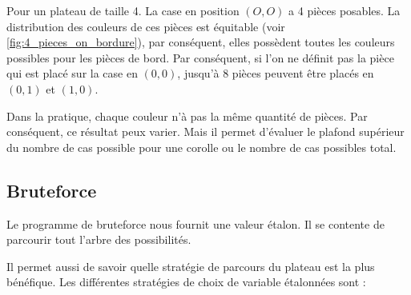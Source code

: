	\begin{exmp}
		Pour un plateau de taille 4. La case en position $(O,O)$ a 4 pièces posables. La distribution des couleurs de ces pièces est équitable (voir \autoref{fig:4_pieces_on_bordure}), par conséquent, elles possèdent toutes les couleurs possibles pour les pièces de bord. Par conséquent, si l'on ne définit pas la pièce qui est placé sur la case en $(0,0)$, jusqu'à 8 pièces peuvent être placés en $(0,1)$ et $(1,0)$.
	\end{exmp}
	\begin{rem}
		 Dans la pratique, chaque couleur n'à pas la même quantité de pièces. Par conséquent, ce résultat peux varier. Mais il permet d'évaluer le plafond supérieur du nombre de cas possible pour une corolle ou le nombre de cas possibles total.
	\end{rem}
\newpage

	\subsection{Bruteforce}
	
	Le programme de bruteforce nous fournit une valeur étalon. Il se contente de parcourir tout l'arbre des possibilités.
	
	Il permet aussi de savoir quelle stratégie de parcours du plateau est la plus bénéfique. Les différentes stratégies de choix de variable étalonnées sont :
	
